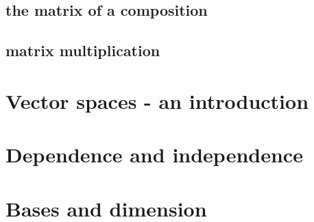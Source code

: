 \subsection{the matrix of a composition}
\subsection{matrix multiplication}

\section{Vector spaces - an introduction}
\label{sec:spaces}

\section{Dependence and independence}
\label{sec:ind}

\section{Bases and dimension}